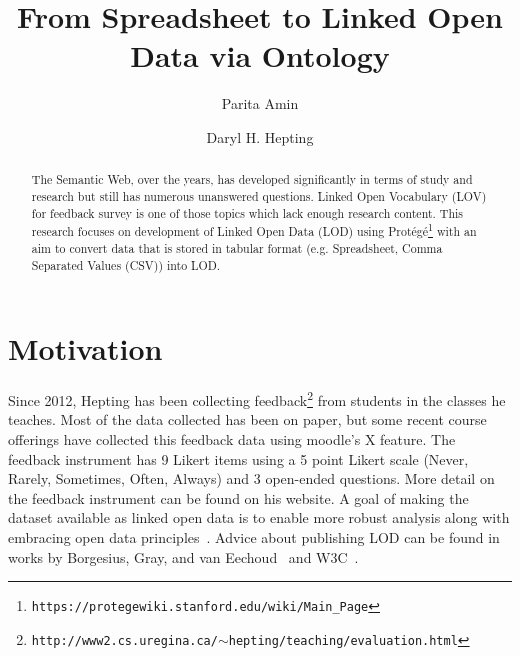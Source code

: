 \documentclass[runningheads]{llncs}
\begin{document}
%
\title{From Spreadsheet to Linked Open Data via Ontology}
%
%
\author{Parita Amin \and
Daryl H. Hepting}
%
%
%
\maketitle              %
%
\begin{abstract}
The Semantic Web, over the years, has developed significantly in terms of study and research but still has numerous unanswered questions. Linked Open Vocabulary (LOV) for feedback survey is one of those topics which lack enough research content. This research focuses on development of Linked Open Data (LOD) using Protégé\footnote{\tt https://protegewiki.stanford.edu/wiki/Main\_Page} with an aim to convert data that is stored in tabular format (e.g. Spreadsheet, Comma Separated Values (CSV)) into LOD.


\end{abstract}

\section{Motivation}
Since 2012, Hepting has been collecting 
feedback\footnote{\tt http://www2.cs.uregina.ca/$\sim$hepting/teaching/evaluation.html} from students in the classes he teaches.
Most of the data collected has been on paper, but some recent course offerings have collected this feedback data using moodle's X feature. The feedback instrument has 9 Likert items using a 5 point Likert scale (Never, Rarely, Sometimes, Often, Always) and 3 open-ended questions. 
More detail on the feedback instrument can be found on his website\footnotemark[2].
A goal of making the dataset available as linked open data is to enable more robust 
analysis along with embracing
open data principles~\cite{principles}. 
Advice about publishing LOD can be found in works by Borgesius, Gray, and van Eechoud~\cite{guide} and W3C~\cite{advice}.
\end{document}
